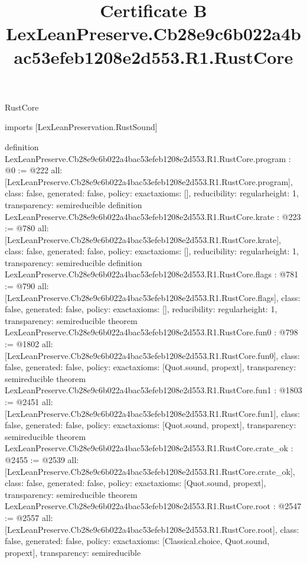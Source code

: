 \begin{lexlean}{RustCore}
\title{Certificate B LexLeanPreserve.Cb28e9c6b022a4bac53efeb1208e2d553.R1.RustCore}
\begin{coremodule}
imports [LexLeanPreservation.RustSound]

definition LexLeanPreserve.Cb28e9c6b022a4bac53efeb1208e2d553.R1.RustCore.program : @0 := @222 {
  all: [LexLeanPreserve.Cb28e9c6b022a4bac53efeb1208e2d553.R1.RustCore.program],
  class: false,
  generated: false,
  policy: exact{axioms: []},
  reducibility: regular{height: 1},
  transparency: semireducible
}
definition LexLeanPreserve.Cb28e9c6b022a4bac53efeb1208e2d553.R1.RustCore.krate : @223 := @780 {
  all: [LexLeanPreserve.Cb28e9c6b022a4bac53efeb1208e2d553.R1.RustCore.krate],
  class: false,
  generated: false,
  policy: exact{axioms: []},
  reducibility: regular{height: 1},
  transparency: semireducible
}
definition LexLeanPreserve.Cb28e9c6b022a4bac53efeb1208e2d553.R1.RustCore.flags : @781 := @790 {
  all: [LexLeanPreserve.Cb28e9c6b022a4bac53efeb1208e2d553.R1.RustCore.flags],
  class: false,
  generated: false,
  policy: exact{axioms: []},
  reducibility: regular{height: 1},
  transparency: semireducible
}
theorem LexLeanPreserve.Cb28e9c6b022a4bac53efeb1208e2d553.R1.RustCore.fun0 : @798 := @1802 {
  all: [LexLeanPreserve.Cb28e9c6b022a4bac53efeb1208e2d553.R1.RustCore.fun0],
  class: false,
  generated: false,
  policy: exact{axioms: [Quot.sound, propext]},
  transparency: semireducible
}
theorem LexLeanPreserve.Cb28e9c6b022a4bac53efeb1208e2d553.R1.RustCore.fun1 : @1803 := @2451 {
  all: [LexLeanPreserve.Cb28e9c6b022a4bac53efeb1208e2d553.R1.RustCore.fun1],
  class: false,
  generated: false,
  policy: exact{axioms: [Quot.sound, propext]},
  transparency: semireducible
}
theorem LexLeanPreserve.Cb28e9c6b022a4bac53efeb1208e2d553.R1.RustCore.crate_ok : @2455 := @2539 {
  all: [LexLeanPreserve.Cb28e9c6b022a4bac53efeb1208e2d553.R1.RustCore.crate_ok],
  class: false,
  generated: false,
  policy: exact{axioms: [Quot.sound, propext]},
  transparency: semireducible
}
theorem LexLeanPreserve.Cb28e9c6b022a4bac53efeb1208e2d553.R1.RustCore.root : @2547 := @2557 {
  all: [LexLeanPreserve.Cb28e9c6b022a4bac53efeb1208e2d553.R1.RustCore.root],
  class: false,
  generated: false,
  policy: exact{axioms: [Classical.choice, Quot.sound, propext]},
  transparency: semireducible
}


\end{coremodule}
\end{lexlean}
